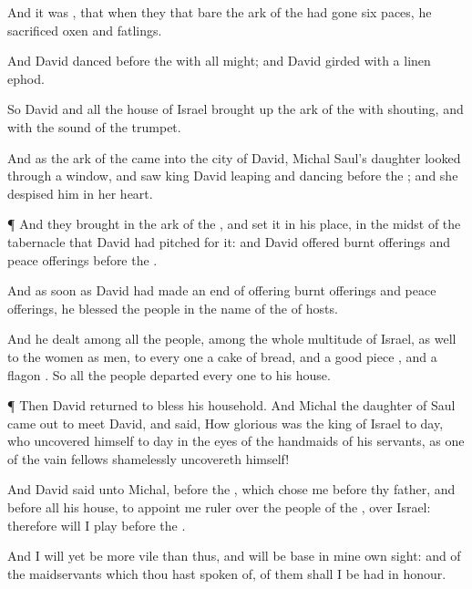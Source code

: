 {And it was
{}, that when they that
bare the
ark of the
{} had
gone
six
paces, he
sacrificed
oxen and
fatlings.

And
David
danced
before the
{} with all
{}
might; and
David
{}
girded with a
linen
ephod.

So
David and all the
house of
Israel brought
up the
ark of the
{} with
shouting, and with the
sound of the
trumpet.

And as the
ark of the
{}
came into the
city of
David,
Michal
Saul’s
daughter
looked through a
window, and
saw
king
David
leaping and
dancing
before the
{}; and she
despised him in her
heart.


\par }{\PP {}¶ And they
brought in the
ark of the
{}, and
set it in his
place, in the
midst of the
tabernacle that
David had
pitched for it: and
David
offered burnt
offerings and peace
offerings
before the
{}.

And as soon as
David had made an
end of
offering burnt
offerings and peace
offerings, he
blessed the
people in the
name of the
{} of
hosts.

And he
dealt among all the
people,
{} among the whole
multitude of
Israel, as well to the
women as
men, to every
one
a
cake of
bread, and a good
piece
{}, and a
flagon
{}. So all the
people
departed every
one to his
house.


\par }{\PP {}¶ Then
David
returned to
bless his
household. And
Michal the
daughter of
Saul came
out to
meet
David, and
said, How
glorious was the
king of
Israel to
day, who
uncovered himself to
day in the
eyes of the
handmaids of his
servants, as
one of the vain
fellows
shamelessly
uncovereth himself!

And
David
said unto
Michal,
{}
before the
{}, which
chose me before thy
father, and before all his
house, to
appoint me
ruler over the
people of the
{}, over
Israel: therefore will I
play
before the
{}.

And I will yet be more
vile than
thus, and will be
base in mine own
sight: and of the
maidservants which thou hast
spoken of, of them shall I be had in
honour.

}
